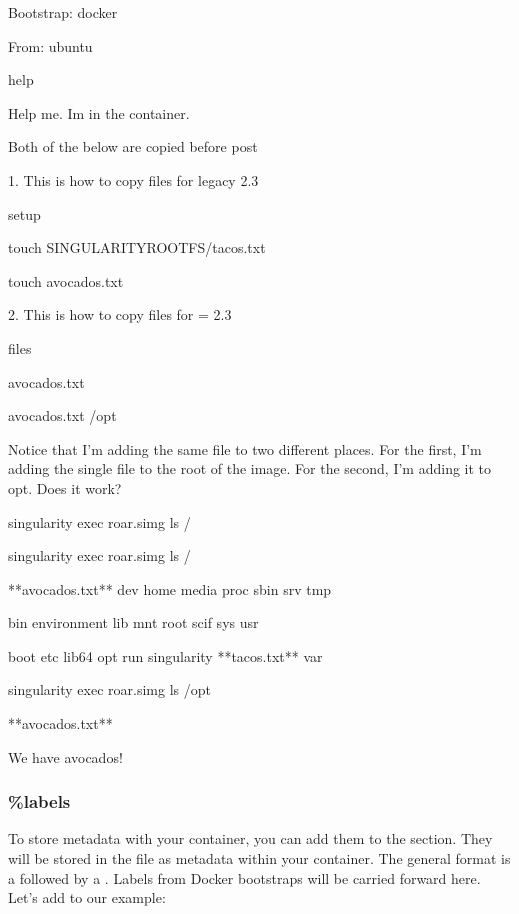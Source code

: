 \documentclass[letterpaper,10pt,english]{sphinxmanual}
\begin{document}
%
\begin{sphinxVerbatim}[commandchars=\\\{\}]
Bootstrap: docker

From: ubuntu


\PYGZpc{}help

Help me. I\PYGZsq{}m in the container.


\PYGZsh{} Both of the below are copied before \PYGZpc{}post

\PYGZsh{} 1. This is how to copy files for legacy \PYGZlt{} 2.3


\PYGZpc{}setup

    touch \PYGZdl{}\PYGZob{}SINGULARITY\PYGZus{}ROOTFS\PYGZcb{}/tacos.txt

    touch avocados.txt


\PYGZsh{} 2. This is how to copy files for \PYGZgt{}= 2.3


\PYGZpc{}files

    avocados.txt

    avocados.txt /opt
\end{sphinxVerbatim}

Notice that I’m adding the same file to two different places. For the
first, I’m adding the single file to the root of the image. For the
second, I’m adding it to opt. Does it work?

%
\begin{sphinxVerbatim}[commandchars=\\\{\}]
\PYGZdl{} singularity exec roar.simg ls /

 singularity exec roar.simg ls /

**avocados.txt**  dev      home   media  proc  sbin     srv        tmp

bin       environment  lib    mnt    root  scif     sys        usr

boot          etc      lib64  opt    run   singularity  **tacos.txt**  var


\PYGZdl{} singularity exec roar.simg ls /opt

**avocados.txt**
\end{sphinxVerbatim}

We have avocados!


\subsubsection{\%labels}
\label{\detokenize{container_recipes:labels}}
To store metadata with your container, you can add them to the  section.
They will be stored in the file  as metadata within your container. The
general format is a  followed by a . Labels from Docker bootstraps will
be carried forward here. Let’s add to our example:
\end{document}
